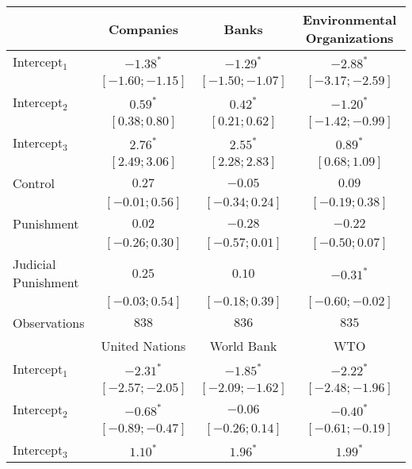 \begin{table}[h]
\begin{center}
\begin{threeparttable}
\begin{tabular}{l c c c}
\hline
 & Companies & Banks & Environmental
Organizations \\
\hline
Intercept$_1$       & $-1.38^{*}$       & $-1.29^{*}$       & $-2.88^{*}$       \\
                    & $ [-1.60; -1.15]$ & $ [-1.50; -1.07]$ & $ [-3.17; -2.59]$ \\
Intercept$_2$       & $0.59^{*}$        & $0.42^{*}$        & $-1.20^{*}$       \\
                    & $ [ 0.38;  0.80]$ & $ [ 0.21;  0.62]$ & $ [-1.42; -0.99]$ \\
Intercept$_3$       & $2.76^{*}$        & $2.55^{*}$        & $0.89^{*}$        \\
                    & $ [ 2.49;  3.06]$ & $ [ 2.28;  2.83]$ & $ [ 0.68;  1.09]$ \\
Control             & $0.27$            & $-0.05$           & $0.09$            \\
                    & $ [-0.01;  0.56]$ & $ [-0.34;  0.24]$ & $ [-0.19;  0.38]$ \\
Punishment          & $0.02$            & $-0.28$           & $-0.22$           \\
                    & $ [-0.26;  0.30]$ & $ [-0.57;  0.01]$ & $ [-0.50;  0.07]$ \\
Judicial Punishment & $0.25$            & $0.10$            & $-0.31^{*}$       \\
                    & $ [-0.03;  0.54]$ & $ [-0.18;  0.39]$ & $ [-0.60; -0.02]$ \\
\hline
Observations        & $838$             & $836$             & $835$             \\
\hline
 & United Nations & World Bank & WTO \\
\hline
Intercept$_1$       & $-2.31^{*}$       & $-1.85^{*}$       & $-2.22^{*}$       \\
                    & $ [-2.57; -2.05]$ & $ [-2.09; -1.62]$ & $ [-2.48; -1.96]$ \\
Intercept$_2$       & $-0.68^{*}$       & $-0.06$           & $-0.40^{*}$       \\
                    & $ [-0.89; -0.47]$ & $ [-0.26;  0.14]$ & $ [-0.61; -0.19]$ \\
Intercept$_3$       & $1.10^{*}$        & $1.96^{*}$        & $1.99^{*}$        \\

\end{tabular}
\end{threeparttable}
\end{center}
\end{table}
